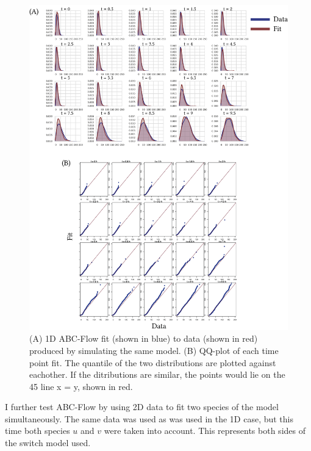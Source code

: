 \begin{figure}[htbp]
\centering
	\includegraphics[scale=0.9]{../../chapters/chapterABCFlow/images/1D_sim_res.png}
	\caption[LoF caption]{\label{fig:1d-sim-res} (A) 1D ABC-Flow fit (shown in blue) to data (shown in red) produced by simulating the same model. (B) QQ-plot of each time point fit. The quantile of the two distributions are plotted against eachother. If the ditributions are similar, the points would lie on the 45\textdegree{} line x = y, shown in red. }
\end{figure}

I further test ABC-Flow by using 2D data to fit two species of the model simultaneously. The same data was used as was used in the 1D case, but this time both species $u$ and $v$ were taken into account. This represents both sides of the switch model used. 

